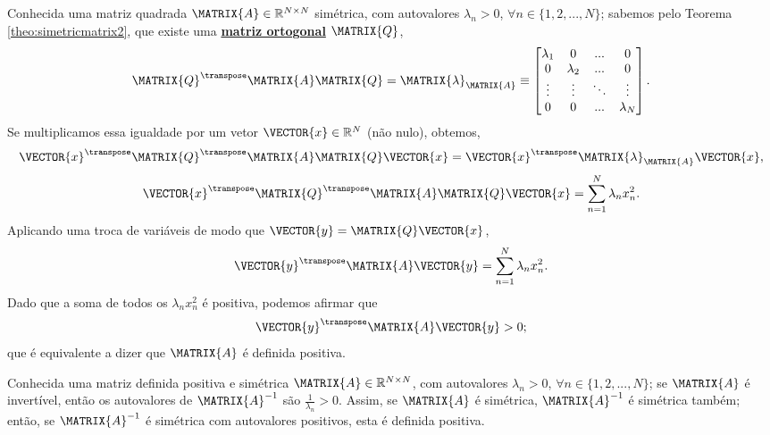 \begin{myproofT}\label{proof:theo:positivematrix2}
Conhecida uma matriz quadrada $\MATRIX{A} \in \mathbb{R}^{N \times N}$ simétrica,
com  autovalores $\lambda_n>0$, $\forall n \in \{1, 2, ..., N\}$;
sabemos pelo Teorema \ref{theo:simetricmatrix2}, 
que existe uma \hyperref[def:ortogonalmatrix0]{\textbf{matriz ortogonal}} $\MATRIX{Q}$,
\begin{equation}
\MATRIX{Q}^{\transpose}\MATRIX{A}\MATRIX{Q} = \MATRIX{\lambda}_{\MATRIX{A}}\equiv
\begin{bmatrix}
\lambda_1 & 0         & ...    & 0 \\
0         & \lambda_2 & ...    & 0 \\
\vdots    & \vdots    & \ddots & \vdots \\
0         & 0         & ...    & \lambda_N
\end{bmatrix}.
\end{equation}
Se multiplicamos essa igualdade por um vetor $\VECTOR{x} \in \mathbb{R}^N$ (não nulo), obtemos,
\begin{equation}
\VECTOR{x}^{\transpose} \MATRIX{Q}^{\transpose}\MATRIX{A}\MATRIX{Q} \VECTOR{x} = 
\VECTOR{x}^{\transpose} \MATRIX{\lambda}_{\MATRIX{A}} \VECTOR{x},
\end{equation}
\begin{equation}
\VECTOR{x}^{\transpose} \MATRIX{Q}^{\transpose}\MATRIX{A}\MATRIX{Q} \VECTOR{x} 
= \sum \limits_{n=1}^{N}\lambda_n x_n^2.
\end{equation}
Aplicando uma troca de variáveis de modo que $\VECTOR{y}=\MATRIX{Q} \VECTOR{x}$,
\begin{equation}
\VECTOR{y}^{\transpose} \MATRIX{A} \VECTOR{y} 
= \sum \limits_{n=1}^{N}\lambda_n x_n^2.
\end{equation}
Dado que a soma de todos os $\lambda_n x_n^2$ é positiva, podemos afirmar que
\begin{equation}
\VECTOR{y}^{\transpose} \MATRIX{A} \VECTOR{y} > 0;
\end{equation}
que é equivalente a dizer que $\MATRIX{A}$ é definida positiva.
\end{myproofT}

\begin{myproofT}\label{proof:theo:positivematrix:2}
Conhecida uma matriz definida positiva e simétrica $\MATRIX{A} \in \mathbb{R}^{N \times N}$,
com  autovalores $\lambda_n>0$, $\forall n \in \{1, 2, ..., N\}$;
se $\MATRIX{A}$  é invertível, então os autovalores de $\MATRIX{A}^{-1}$ são  $\frac{1}{\lambda_n}>0$.
Assim, se $\MATRIX{A}$ é simétrica, $\MATRIX{A}^{-1}$ é simétrica também;
então, se $\MATRIX{A}^{-1}$ é simétrica com autovalores positivos, esta é definida positiva.
\end{myproofT}

